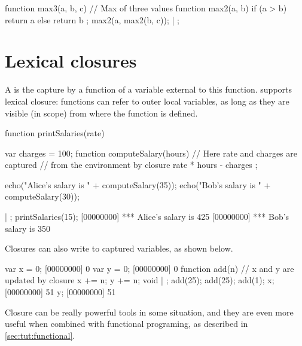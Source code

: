 \begin{urbiscript}
function max3(a, b, c) // Max of three values
{
  function max2(a, b)
  {
    if (a > b)
      return a
    else
      return b
  };
  max2(a, max2(b, c));
} | {};
\end{urbiscript}

\section{Lexical closures}

A  is the capture by a function of a variable external to this
function. \us supports lexical closure: functions can refer to outer
local variables, as long as they are visible (in scope) from where
the function is defined.

\begin{urbiscript}
function printSalaries(rate)
{
  var charges = 100;
  function computeSalary(hours)
  {
    // Here rate and charges are captured
    // from the environment by closure
    rate * hours - charges
  };

  echo("Alice's salary is " + computeSalary(35));
  echo("Bob's salary is " + computeSalary(30));
} | {};
printSalaries(15);
[00000000] *** Alice's salary is 425
[00000000] *** Bob's salary is 350
\end{urbiscript}

Closures can also write to captured variables, as shown below.

\begin{urbiscript}
var x = 0;
[00000000] 0
var y = 0;
[00000000] 0
function add(n)
{
  // x and y are updated by closure
  x += n;
  y += n;
  void
} | {};
add(25);
add(25);
add(1);
x;
[00000000] 51
y;
[00000000] 51
\end{urbiscript}

Closure can be really powerful tools in some situation, and they are
even more useful when combined with functional programing, as
described in \autoref{sec:tut:functional}.



